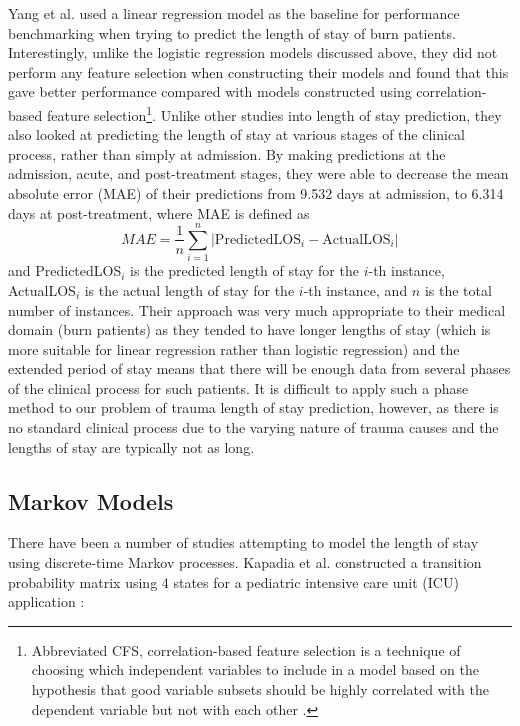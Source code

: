 Yang et al. \citep{Yang2010} used a linear regression model as the baseline for
performance benchmarking when trying to predict the length of stay of burn
patients. Interestingly, unlike the logistic regression models discussed above,
they did not perform any feature selection when constructing their models and
found that this gave better performance compared with models constructed using
correlation-based feature selection\footnote{Abbreviated CFS, correlation-based
feature selection is a technique of choosing which independent variables to
include in a model based on the hypothesis that good variable subsets should
be highly correlated with the dependent variable but not with each
other \citep{Hall2000}.}. Unlike other studies into length of stay prediction,
they also looked at predicting the length of stay at various stages of the
clinical process, rather than simply at admission. By making predictions
at the admission, acute, and post-treatment stages, they were able to decrease
the mean absolute error (MAE) of their predictions from 9.532 days at admission,
to 6.314 days at post-treatment, where MAE is defined as
\begin{equation*}
MAE = \dfrac{1}{n}\sum_{i=1}^n |\mathrm{PredictedLOS}_i-\mathrm{ActualLOS}_i|
\end{equation*}
and PredictedLOS$_i$ is the predicted length of stay for the $i$-th instance,
ActualLOS$_i$ is the actual length of stay for the $i$-th instance, and $n$
is the total number of instances. Their approach was very much appropriate to
their medical domain (burn patients) as they tended to have longer lengths of
stay (which is more suitable for linear regression rather than logistic
regression) and the extended period of stay means that there will be enough
data from several phases of the clinical process for such patients. It is
difficult to apply such a phase method to our problem of trauma length of
stay prediction, however, as there is no standard clinical process due to
the varying nature of trauma causes and the lengths of stay are typically not
as long.

\subsection{Markov Models}
There have been a number of studies attempting to model the length of stay
using discrete-time Markov processes. Kapadia et al. constructed a transition
probability matrix using 4 states for a pediatric intensive care unit (ICU)
application \citep{Kapadia2000}:


